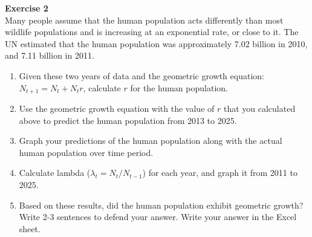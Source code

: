 \documentclass[12pt]{article}\usepackage[]{graphicx}\usepackage[]{xcolor}
\begin{document}








{\bf Exercise 2 \\}
Many people assume that the human population acts differently than
most wildlife populations and is increasing at an exponential rate, or
close to it. The UN estimated that the human population was
approximately 7.02 billion in 2010, and 7.11 billion in 2011.


\begin{enumerate}
  \item Given these two years of data and the geometric growth equation:
    $N_{t+1} = N_t + N_t r$, calculate $r$ for the human population. 
  \item Use the geometric growth equation with the value of $r$ that
    you calculated above to predict the human population from 2013 to
    2025. 
  \item Graph your predictions of the human population along with the
    actual human population over time period.
  \item Calculate lambda ($\lambda_t = N_t / N_{t-1}$) for each year,
    and graph it from 2011 to 2025. 
  \item Based on these results, did the human population exhibit
    geometric growth? Write 2-3 sentences to defend your answer. 
    Write your answer in the Excel sheet.
\end{enumerate}
\end{document}
